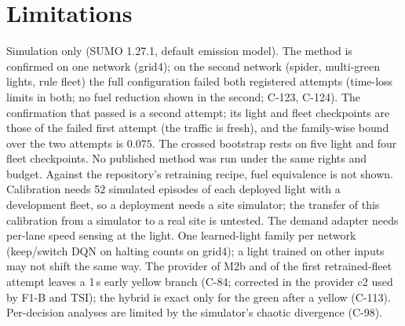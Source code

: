 \documentclass[11pt]{article}
\begin{document}
\section{Limitations}
Simulation only (SUMO 1.27.1, default emission model). The method is confirmed on one network (grid4); on the second network (spider, multi-green
lights, rule fleet) the full configuration failed both registered attempts (time-loss limits in both; no fuel reduction shown in the second;
C-123, C-124). The confirmation that
passed is a second attempt; its light and fleet checkpoints are those of the failed first attempt (the traffic is fresh), and the
family-wise bound over the two attempts is $0.075$. The crossed bootstrap rests on five light and four fleet checkpoints. No published
method was run under the same rights and budget. Against the repository's retraining recipe, fuel equivalence is not shown. Calibration needs 52 simulated episodes of each deployed light with a development fleet, so a deployment needs a site simulator; the
transfer of this calibration from a simulator to a real site is untested. The demand adapter needs per-lane speed sensing at the light. One learned-light family per network (keep/switch DQN on halting counts on grid4); a
light trained on other inputs may not shift the same way. The provider of M2b and of the first retrained-fleet attempt leaves a 1\,s early yellow branch (C-84;
corrected in the provider c2 used by F1-B and TSI); the hybrid is exact only for the green after a yellow (C-113). Per-decision analyses are limited by the simulator's chaotic divergence
(C-98).
\end{document}
